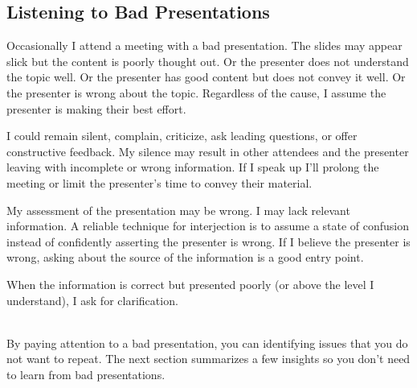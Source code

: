 \subsection*{Listening to Bad Presentations\label{sec:bad-presentations}}

Occasionally I attend a meeting with a bad presentation. The slides may appear slick but the content is poorly thought out. Or the presenter does not understand the topic well. Or the presenter has good content but does not convey it well. Or the presenter is wrong about the topic. Regardless of the cause, I assume the presenter is making their best effort. 

I could remain silent, complain, criticize, ask leading questions, or offer constructive feedback. My silence may result in other attendees and the presenter leaving with incomplete or wrong information. If I speak up I'll prolong the meeting or limit the presenter's time to convey their material. 

My assessment of the presentation may be wrong. I may lack relevant information. A reliable technique for interjection is to assume a state of confusion instead of confidently asserting the presenter is wrong. 
If I believe the presenter is wrong, asking about the source of the information is a good entry point.

When the information is correct but presented poorly (or above the level I understand), I ask for clarification. 

\ \\


By paying attention to a bad presentation, you can identifying issues that you do not want to repeat. The next section summarizes a few insights so you don't need to learn from bad presentations.